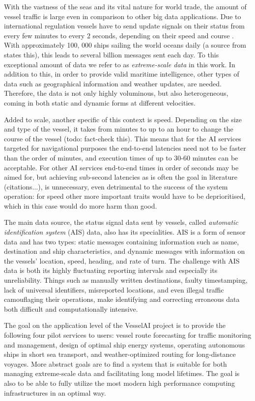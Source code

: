 With the vastness of the seas and its vital nature for world trade, the amount of vessel traffic is large even in comparison to other big data applications. Due to international regulation vessels have to send update signals on their status from every few minutes to every 2 seconds, depending on their speed and course \cite{maritimeinformatics}. With approximately 100, 000 ships sailing the world oceans daily (a source from \cite{maritimeinformatics} states this), this leads to several billion messages sent each day. To this exceptional amount of data we refer to as \textit{extreme-scale data} in this work. In addition to this, in order to provide valid maritime intelligence, other types of data such as geographical information and weather updates, are needed. Therefore, the data is not only highly voluminous, but also heterogeneous, coming in both static and dynamic forms at different velocities.

Added to scale, another specific of this context is speed. Depending on the size and type of the vessel, it takes from minutes to up to an hour to change the course of the vessel (todo: fact-check this). This means that for the AI services targeted for navigational purposes the end-to-end latencies need not to be faster than the order of minutes, and execution times of up to 30-60 minutes can be acceptable. For other AI services end-to-end times in order of seconds may be aimed for, but achieving sub-second latencies as is often the goal in literature (citations...), is unnecessary, even detrimental to the success of the system operation: for speed other more important traits would have to be deprioritised, which in this case would do more harm than good.

The main data source, the status signal data sent by vessels, called \textit{automatic identification system} (AIS) data, also has its specialities. AIS is a form of sensor data and has two types: static messages containing information such as name, destination and ship characteristics, and dynamic messages with information on the vessels' location, speed, heading, and rate of turn. The challenge with AIS data is both its highly fluctuating reporting intervals and especially its unreliability.  Things such as manually written destinations, faulty timestamping, lack of universal identifiers, misreported locations, and even illegal traffic camouflaging their operations, make identifying and correcting erroneous data both difficult and computationally intensive.

The goal on the application level of the VesselAI project is to provide the following four pilot services to users: vessel route forecasting for traffic monitoring and management, design of optimal ship energy systems, operating autonomous ships in short sea transport, and weather-optimized routing for long-distance voyages. More abstract goals are to find a system that is suitable for both managing extreme-scale data and facilitating long model lifetimes. The goal is also to be able to fully utilize the most modern high performance computing infrastructures in an optimal way.

